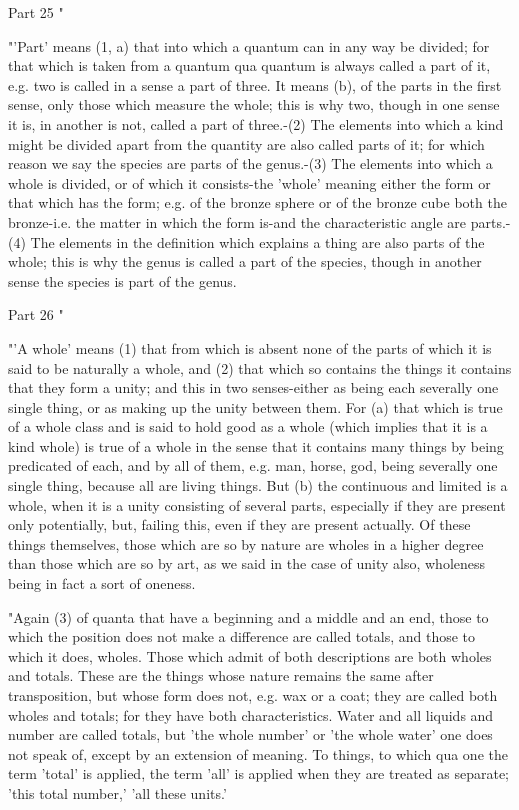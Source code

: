 Part 25 "

"'Part' means (1, a) that into which a quantum can in any way be
divided; for that which is taken from a quantum qua quantum is always
called a part of it, e.g. two is called in a sense a part of three.
It means (b), of the parts in the first sense, only those which measure
the whole; this is why two, though in one sense it is, in another
is not, called a part of three.-(2) The elements into which a kind
might be divided apart from the quantity are also called parts of
it; for which reason we say the species are parts of the genus.-(3)
The elements into which a whole is divided, or of which it consists-the
'whole' meaning either the form or that which has the form; e.g. of
the bronze sphere or of the bronze cube both the bronze-i.e. the matter
in which the form is-and the characteristic angle are parts.-(4) The
elements in the definition which explains a thing are also parts of
the whole; this is why the genus is called a part of the species,
though in another sense the species is part of the genus.

Part 26 "

"'A whole' means (1) that from which is absent none of the parts of
which it is said to be naturally a whole, and (2) that which so contains
the things it contains that they form a unity; and this in two senses-either
as being each severally one single thing, or as making up the unity
between them. For (a) that which is true of a whole class and is said
to hold good as a whole (which implies that it is a kind whole) is
true of a whole in the sense that it contains many things by being
predicated of each, and by all of them, e.g. man, horse, god, being
severally one single thing, because all are living things. But (b)
the continuous and limited is a whole, when it is a unity consisting
of several parts, especially if they are present only potentially,
but, failing this, even if they are present actually. Of these things
themselves, those which are so by nature are wholes in a higher degree
than those which are so by art, as we said in the case of unity also,
wholeness being in fact a sort of oneness. 

"Again (3) of quanta that have a beginning and a middle and an end,
those to which the position does not make a difference are called
totals, and those to which it does, wholes. Those which admit of both
descriptions are both wholes and totals. These are the things whose
nature remains the same after transposition, but whose form does not,
e.g. wax or a coat; they are called both wholes and totals; for they
have both characteristics. Water and all liquids and number are called
totals, but 'the whole number' or 'the whole water' one does not speak
of, except by an extension of meaning. To things, to which qua one
the term 'total' is applied, the term 'all' is applied when they are
treated as separate; 'this total number,' 'all these units.'

